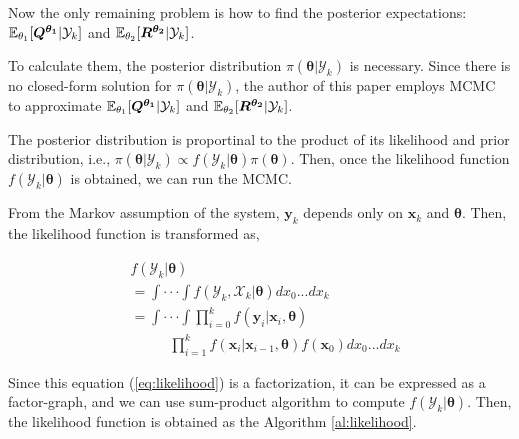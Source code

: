 Now the only remaining problem is how to find the posterior expectations: $\mathbb{E}_{\theta_1}[\bm {Q^{\theta_1}}|\mathcal{Y}_k]$ and $\mathbb{E}_{\theta_2}[\bm{R^{\theta_2}}|\mathcal{Y}_k]$.

To calculate them, the posterior distribution $\pi(\bm{\theta}|\mathcal{Y}_k)$ is necessary. Since there is no closed-form solution for $\pi(\bm{\theta}|\mathcal{Y}_k)$, the author of this paper employs MCMC to approximate $\mathbb{E}_{\theta_1}[\bm {Q^{\theta_1}}|\mathcal{Y}_k]$ and $\mathbb{E}_{\theta_2}[\bm{R^{\theta_2}}|\mathcal{Y}_k]$.

The posterior distribution is proportinal to the product of its likelihood and prior distribution, i.e., $\pi (\bm{\theta}|\mathcal{Y}_k) \propto f(\mathcal{Y}_k|\bm{\theta})\pi(\bm{\theta})$. Then, once the likelihood function $f(\mathcal{Y}_k|\bm{\theta})$ is obtained, we can run the MCMC.

From the Markov assumption of the system, $\bm{y}_k$ depends only on $\bm{x}_k$ and $\bm{\theta}$. Then, the likelihood function is transformed as,

\begin{align} \label{eq:likelihood}
&f(\mathcal{Y}_k|\bm{\theta}) \nonumber\\
& = \int\cdot\cdot\cdot\int f(\mathcal{Y}_k, \mathcal{X}_k|\bm{\theta})dx_0...dx_k \nonumber\\
& = \int\cdot\cdot\cdot\int \prod^{k}_{i=0}f(\bm{y}_i| \bm{x}_i,\bm{\theta})\nonumber\\
&\;\;\;\;\;\;\;\;\;\;\prod^{k}_{i=1}f(\bm{x}_i|\bm{x}_{i-1}, \bm{\theta})f(\bm{x}_0)dx_0...dx_k
\end{align}

Since this equation (\ref{eq:likelihood}) is a factorization, it can be expressed as a factor-graph, and we can use sum-product algorithm\cite{Kschischang2001} to compute $f(\mathcal{Y}_k|\bm{\theta})$. Then, the likelihood function is obtained as the Algorithm \ref{al:likelihood}.

